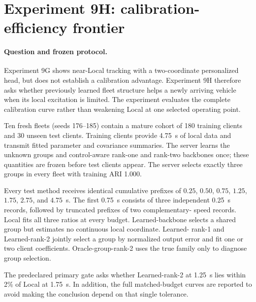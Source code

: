 \section{Experiment 9H: calibration-efficiency frontier}
\label{sec:experiment9h}

\paragraph{Question and frozen protocol.}
Experiment 9G shows near-Local tracking with a two-coordinate personalized head,
but does not establish a calibration advantage. Experiment 9H therefore asks
whether previously learned fleet structure helps a newly arriving vehicle when
its local excitation is limited. The experiment evaluates the complete
calibration curve rather than weakening Local at one selected operating point.

Ten fresh fleets (seeds 176--185) contain a mature cohort of 180 training clients
and 30 unseen test clients. Training clients provide 4.75~s of local data and
transmit fitted parameter and covariance summaries. The server learns the unknown
groups and control-aware rank-one and rank-two backbones once; these quantities
are frozen before test clients appear. The server selects exactly three groups
in every fleet with training ARI 1.000.

Every test method receives identical cumulative prefixes of $0.25$, $0.50$,
$0.75$, $1.25$, $1.75$, $2.75$, and $4.75$~s. The first 0.75~s consists of three
independent 0.25~s records, followed by truncated prefixes of two complementary-
speed records. Local fits all three ratios at every budget. Learned-backbone
selects a shared group but estimates no continuous local coordinate. Learned-
rank-1 and Learned-rank-2 jointly select a group by normalized output error and
fit one or two client coefficients. Oracle-group-rank-2 uses the true family
only to diagnose group selection.

The predeclared primary gate asks whether Learned-rank-2 at 1.25~s lies within
2\% of Local at 1.75~s. In addition, the full matched-budget curves are reported
to avoid making the conclusion depend on that single tolerance.

